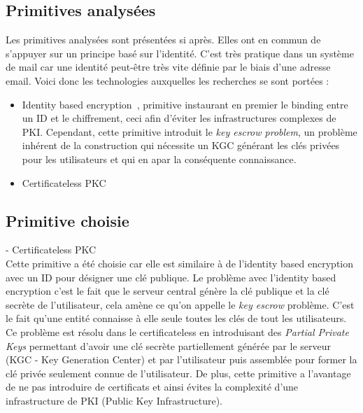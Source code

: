 \subsection{Primitives analysées}
Les primitives analysées sont présentées si après. Elles ont en commun de s'appuyer sur un principe basé sur l'identité. C'est très pratique dans un système de mail car une identité peut-être très vite définie par le biais d'une adresse email. Voici donc les technologies auxquelles les recherches se sont portées :
\begin{itemize}
	\item Identity based encryption~\cite{DBLP:conf/crypto/Shamir84}, primitive instaurant en premier le binding entre un ID et le chiffrement, ceci afin d'éviter les infrastructures complexes de PKI. Cependant, cette primitive introduit le \textit{key escrow problem}, un problème inhérent de la construction qui nécessite un KGC générant les clés privées pour les utilisateurs et qui en apar la conséquente connaissance.
	\item Certificateless PKC~\cite{DBLP:conf/asiacrypt/Al-RiyamiP03}
\end{itemize}
\subsection{Primitive choisie}
- Certificateless PKC~\cite{DBLP:conf/asiacrypt/Al-RiyamiP03}\\
 Cette primitive a été choisie car elle est similaire à de l'identity based encryption avec un ID pour désigner une clé publique. Le problème avec l'identity based encryption c'est le fait que le serveur central génère la clé publique et la clé secrète de l'utilisateur, cela amène ce qu'on appelle le \textit{key escrow} problème. C'est le fait qu'une entité connaisse à elle seule toutes les clés de tout les utilisateurs. Ce problème est résolu dans le certificateless en introduisant des \textit{Partial Private Keys} permettant d'avoir une clé secrète partiellement générée par le serveur (KGC - Key Generation Center) et par l'utilisateur puis assemblée pour former la clé privée seulement connue de l'utilisateur. De plus, cette primitive a l'avantage de ne pas introduire de certificats et ainsi évites la complexité d'une infrastructure de PKI (Public Key Infrastructure).
